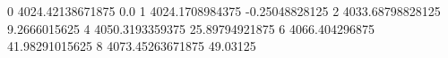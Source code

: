 0 4024.42138671875 0.0
1 4024.1708984375 -0.25048828125
2 4033.68798828125 9.2666015625
4 4050.3193359375 25.89794921875
6 4066.404296875 41.98291015625
8 4073.45263671875 49.03125
